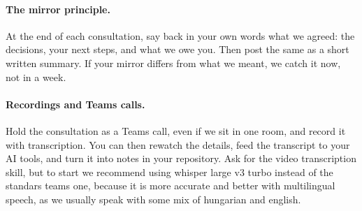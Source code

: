 \paragraph{The mirror principle.} At the end of each consultation, say back in your own words what we agreed: the decisions, your next steps, and what we owe you. Then post the same as a short written summary. If your mirror differs from what we meant, we catch it now, not in a week.

\paragraph{Recordings and Teams calls.} Hold the consultation as a Teams call, even if we sit in one room, and record it with transcription. You can then rewatch the details, feed the transcript to your AI tools, and turn it into notes in your repository. Ask for the video transcription skill, but to start we recommend using whisper large v3 turbo instead of the standars teams one, because it is more accurate and better with multilingual speech, as we usually speak with some mix of hungarian and english. 
